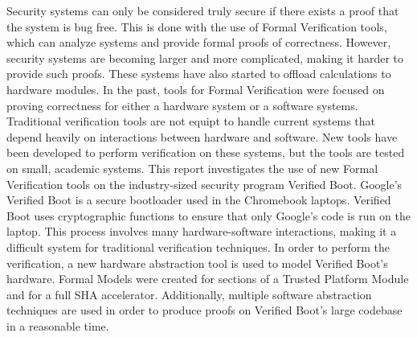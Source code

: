 Security systems can only be considered truly secure if there exists a proof that the system is bug free. 
This is done with the use of Formal Verification tools, which can analyze systems and provide formal proofs of correctness.
However, security systems are becoming larger and more complicated, making it harder to provide such proofs. 
These systems have also started to offload calculations to hardware modules.
In the past, tools for Formal Verification were focused on proving correctness for either a hardware system or a software systems.
Traditional verification tools are not equipt to handle current systems that depend heavily on interactions between hardware and software.
New tools have been developed to perform verification on these systems, but the tools are tested on small, academic systems.
This report investigates the use of new Formal Verification tools on the industry-sized security program Verified Boot.
Google's Verified Boot is a secure bootloader used in the Chromebook laptops.
Verified Boot uses cryptographic functions to ensure that only Google's code is run on the laptop.
This process involves many hardware-software interactions, making it a difficult system for traditional verification techniques.
In order to perform the verification, a new hardware abstraction tool is used to model Verified Boot's hardware.
Formal Models were created for sections of a Trusted Platform Module and for a full SHA accelerator.
Additionally, multiple software abstraction techniques are used in order to produce proofs on Verified Boot's large codebase in a reasonable time.
